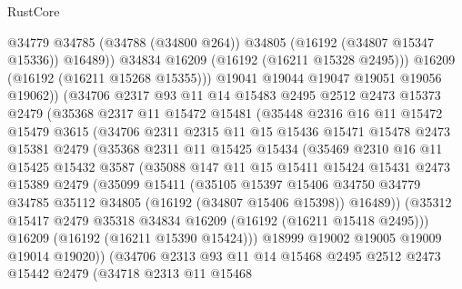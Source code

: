 \begin{lexlean}{RustCore}
\begin{coremodule}
                  @34779
                  @34785
                  (@34788 (@34800 @264))
                  @34805
                  (@16192 (@34807 @15347 @15336))
                  @16489))
              @34834
              @16209
              (@16192 (@16211 @15328 @2495)))
            @16209
            (@16192 (@16211 @15268 @15355)))
          @19041
          @19044
          @19047
          @19051
          @19056
          @19062))
      (@34706
        @2317
        @93
        @11
        @14
        @15483
        @2495
        @2512
        @2473
        @15373
        @2479
        (@35368
          @2317
          @11
          @15472
          @15481
          (@35448
            @2316
            @16
            @11
            @15472
            @15479
            @3615
            (@34706
              @2311
              @2315
              @11
              @15
              @15436
              @15471
              @15478
              @2473
              @15381
              @2479
              (@35368
                @2311
                @11
                @15425
                @15434
                (@35469
                  @2310
                  @16
                  @11
                  @15425
                  @15432
                  @3587
                  (@35088
                    @147
                    @11
                    @15
                    @15411
                    @15424
                    @15431
                    @2473
                    @15389
                    @2479
                    (@35099
                      @15411
                      (@35105
                        @15397
                        @15406
                        @34750
                        @34779
                        @34785
                        @35112
                        @34805
                        (@16192 (@34807 @15406 @15398))
                        @16489))
                    (@35312 @15417 @2479 @35318 @34834 @16209 (@16192 (@16211 @15418 @2495)))
                    @16209
                    (@16192 (@16211 @15390 @15424)))
                  @18999
                  @19002
                  @19005
                  @19009
                  @19014
                  @19020))
              (@34706
                @2313
                @93
                @11
                @14
                @15468
                @2495
                @2512
                @2473
                @15442
                @2479
                (@34718
                  @2313
                  @11
                  @15468

\end{coremodule}
\end{lexlean}
